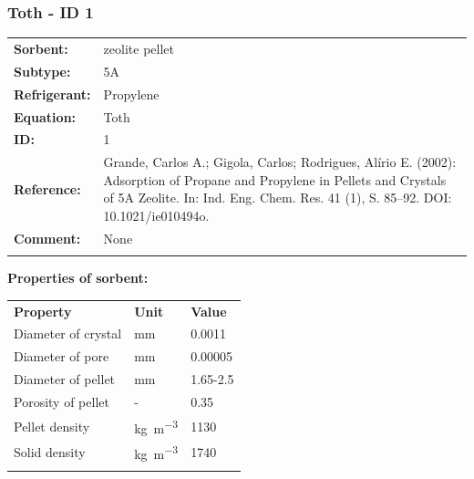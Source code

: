 \subsubsection{Toth - ID 1}
%
\begin{tabular}[l]{|lp{11.5cm}|}
\hline
\addlinespace

\textbf{Sorbent:} & zeolite pellet \\
\textbf{Subtype:} & 5A \\
\textbf{Refrigerant:} & Propylene \\
\textbf{Equation:} & Toth \\
\textbf{ID:} & 1 \\
\textbf{Reference:} & Grande, Carlos A.; Gigola, Carlos; Rodrigues, Alírio E. (2002): Adsorption of Propane and Propylene in Pellets and Crystals of 5A Zeolite. In: Ind. Eng. Chem. Res. 41 (1), S. 85–92. DOI: 10.1021/ie010494o. \\
\textbf{Comment:} & None \\

\addlinespace
\hline
\end{tabular}
\newline

\textbf{Properties of sorbent:}
\newline
%
\begin{longtable}[l]{lll}
\toprule
\addlinespace
\textbf{Property} & \textbf{Unit} & \textbf{Value} \\
\addlinespace
\midrule
\endhead
\bottomrule
\endfoot
\bottomrule
\endlastfoot
\addlinespace

Diameter of crystal & \si{\milli\meter} & 0.0011\\
Diameter of pore & \si{\milli\meter} & 0.00005\\
Diameter of pellet & \si{\milli\meter} & 1.65-2.5\\
Porosity of pellet & - & 0.35\\
Pellet density & \si{\kilogram\per\cubic\meter} & 1130\\
Solid density & \si{\kilogram\per\cubic\meter} & 1740\\

\addlinespace\end{longtable}

